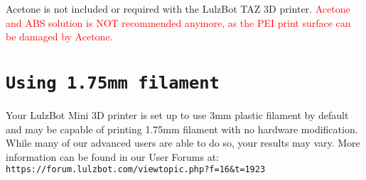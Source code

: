 Acetone is not included or required with the LulzBot TAZ 3D printer. \textcolor{red}{Acetone and ABS solution is NOT recommended anymore, as the PEI print surface can be damaged by Acetone.}


\section{\texttt{Using 1.75mm filament}}

Your LulzBot Mini 3D printer is set up to use 3mm plastic filament by default and may be capable of printing 1.75mm filament with no hardware modification. While many of our advanced users are able to do so, your results may vary.  More information can be found in our User Forums at: \texttt{https://forum.lulzbot.com/viewtopic.php?f=16\&t=1923} 

